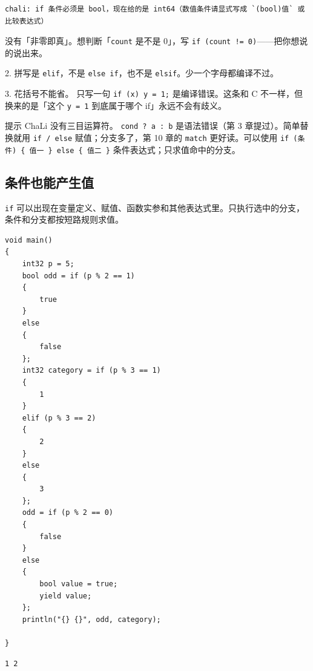 \par
\medskip
\begin{lstlisting}[style=out]
chali: if 条件必须是 bool，现在给的是 int64（数值条件请显式写成 `(bool)值` 或比较表达式）
\end{lstlisting}
\par
\medskip

没有「非零即真」。想判断「\texttt{count} 是不是 0」，写 \texttt{if (\allowbreak{}count !=\allowbreak{} 0)\allowbreak{}}——把你想说的说出来。

2. 拼写是 \texttt{elif}，不是 \texttt{else if}，也不是 \texttt{elsif}。少一个字母都编译不过。

3. 花括号不能省。 只写一句 \texttt{if (\allowbreak{}x)\allowbreak{} y =\allowbreak{} 1;} 是编译错误。这条和 C 不一样，但换来的是「这个 \texttt{y =\allowbreak{} 1} 到底属于哪个 if」永远不会有歧义。

\begin{tip}{提示}
ChaLi 没有三目运算符。 \texttt{cond ? a :\allowbreak{} b} 是语法错误（第 3 章提过）。简单替换就用 \texttt{if /\allowbreak{} else} 赋值；分支多了，第 10 章的 \texttt{match} 更好读。可以使用 \texttt{if (\allowbreak{}条件)\allowbreak{} \{ 值一 \} else \{ 值二 \}} 条件表达式；只求值命中的分支。
\end{tip}

\subsection*{条件也能产生值}

\texttt{if} 可以出现在变量定义、赋值、函数实参和其他表达式里。只执行选中的分支，条件和分支都按短路规则求值。

\par
\medskip
\begin{lstlisting}[style=chali]
void main()
{
    int32 p = 5;
    bool odd = if (p % 2 == 1)
    {
        true
    }
    else
    {
        false
    };
    int32 category = if (p % 3 == 1)
    {
        1
    }
    elif (p % 3 == 2)
    {
        2
    }
    else
    {
        3
    };
    odd = if (p % 2 == 0)
    {
        false
    }
    else
    {
        bool value = true;
        yield value;
    };
    println("{} {}", odd, category);

}
\end{lstlisting}
\par
\medskip

\par
\medskip
\begin{lstlisting}[style=out]
1 2
\end{lstlisting}
\par
\medskip

